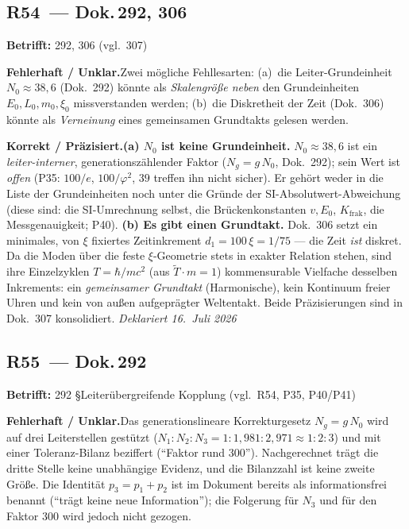 \medskip


\subsection*{R54~--- Dok.\,292, 306}

\noindent\textbf{Betrifft:} 292, 306 (vgl.\ 307)


\smallskip\noindent\textbf{Fehlerhaft / Unklar.}\quad Zwei mögliche Fehllesarten: (a)~die Leiter-Grundeinheit $N_0\approx38{,}6$ (Dok.~292) könnte als \emph{Skalengröße neben} den Grundeinheiten $E_0,L_0,m_0,\xi_0$ missverstanden werden; (b)~die Diskretheit der Zeit (Dok.~306) könnte als \emph{Verneinung} eines gemeinsamen Grundtakts gelesen werden.


\smallskip\noindent\textbf{Korrekt / Präzisiert.}\quad \textbf{(a) $N_0$ ist keine Grundeinheit.} $N_0\approx38{,}6$ ist ein \emph{leiter-interner}, generationszählender Faktor ($N_g=g\,N_0$, Dok.~292); sein Wert ist \emph{offen} (P35: $100/e$, $100/\varphi^2$, $39$ treffen ihn nicht sicher). Er gehört weder in die Liste der Grundeinheiten noch unter die Gründe der SI-Absolutwert-Abweichung (diese sind: die SI-Umrechnung selbst, die Brückenkonstanten $v,E_0$, $K_{\text{frak}}$, die Messgenauigkeit; P40). \textbf{(b) Es gibt einen Grundtakt.} Dok.~306 setzt ein minimales, von $\xi$ fixiertes Zeitinkrement $d_1=100\,\xi=1/75$ --- die Zeit \emph{ist} diskret. Da die Moden über die feste $\xi$-Geometrie stets in exakter Relation stehen, sind ihre Einzelzyklen $T=\hbar/mc^2$ (aus $\tilde T\cdot m=1$) kommensurable Vielfache desselben Inkrements: ein \emph{gemeinsamer Grundtakt} (Harmonische), kein Kontinuum freier Uhren und kein von außen aufgeprägter Weltentakt. Beide Präzisierungen sind in Dok.~307 konsolidiert. \emph{Deklariert 16.~Juli 2026}


\medskip


\subsection*{R55~--- Dok.\,292}

\noindent\textbf{Betrifft:} 292 \S{}Leiterübergreifende Kopplung (vgl.\ R54, P35, P40/P41)


\smallskip\noindent\textbf{Fehlerhaft / Unklar.}\quad Das generationslineare Korrekturgesetz $N_g=g\,N_0$ wird auf drei Leiterstellen gestützt ($N_1{:}N_2{:}N_3=1{:}1{,}981{:}2{,}971\approx1{:}2{:}3$) und mit einer Toleranz-Bilanz beziffert (\enquote{Faktor rund $300$}). Nachgerechnet trägt die dritte Stelle keine unabhängige Evidenz, und die Bilanzzahl ist keine zweite Größe. Die Identität $p_3=p_1+p_2$ ist im Dokument bereits als informationsfrei benannt (\enquote{trägt keine neue Information}); die Folgerung für $N_3$ und für den Faktor $300$ wird jedoch nicht gezogen.


